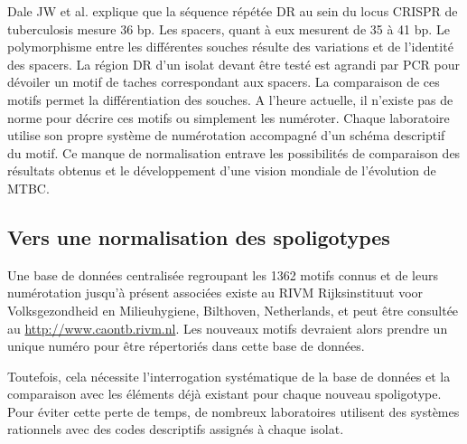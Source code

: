 \documentclass[twoside,a4paper,11pt,frenchb,openany]{report}
\begin{document}
Dale JW et al. explique que la séquence répétée DR au sein du locus CRISPR de tuberculosis mesure 36 bp. Les spacers, quant à eux mesurent de 35 à 41 bp. Le polymorphisme entre les différentes souches résulte des variations et de l'identité des spacers. La région DR d'un isolat devant être testé est agrandi par PCR pour dévoiler un motif de taches correspondant aux spacers. La comparaison de ces motifs permet la différentiation des souches. A l'heure actuelle, il n'existe pas de norme pour décrire ces motifs ou simplement les numéroter. Chaque laboratoire utilise son propre système de numérotation accompagné d'un schéma descriptif du motif. Ce manque de normalisation entrave les possibilités de comparaison des résultats obtenus et le développement d'une vision mondiale de l'évolution de MTBC.

\subsection{Vers une normalisation des spoligotypes}

Une base de données centralisée regroupant les 1362 motifs connus et de leurs numérotation jusqu'à présent associées existe au RIVM Rijksinstituut voor Volksgezondheid en Milieuhygiene, Bilthoven, Netherlands, et peut être consultée au \url{http://www.caontb.rivm.nl}. Les nouveaux motifs devraient alors prendre un unique numéro pour être répertoriés dans cette base de données.

Toutefois, cela nécessite l'interrogation systématique de la base de données et la comparaison avec les éléments déjà existant pour chaque nouveau spoligotype. Pour éviter cette perte de temps, de nombreux laboratoires utilisent des systèmes rationnels avec des codes descriptifs assignés à chaque isolat.


















\end{document}
